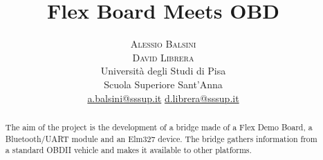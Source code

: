 \documentclass[twoside]{article}
\title{\vspace{-15mm}\fontsize{24pt}{10pt}\selectfont\textbf{Flex Board Meets OBD}} %
\author{
\large
\textsc{Alessio Balsini}\\[2mm] %
\textsc{David Librera}\\[2mm] %
\normalsize Universit\`a degli Studi di Pisa\\ %
\normalsize Scuola Superiore Sant'Anna\\ %
\normalsize \href{mailto:a.balsini@sssup.it}{a.balsini@sssup.it} %
\normalsize \href{mailto:d.librera@sssup.it}{d.librera@sssup.it} %
\vspace{-5mm}
}
\date{}
\begin{document}
\maketitle %

\thispagestyle{fancy} %


\begin{abstract}

\noindent The aim of the project is the development of a bridge made of a Flex Demo Board, a Bluetooth/UART module and an Elm327 device. The bridge gathers information from a standard OBDII vehicle and makes it available to other platforms.

\end{abstract}

\end{document}
